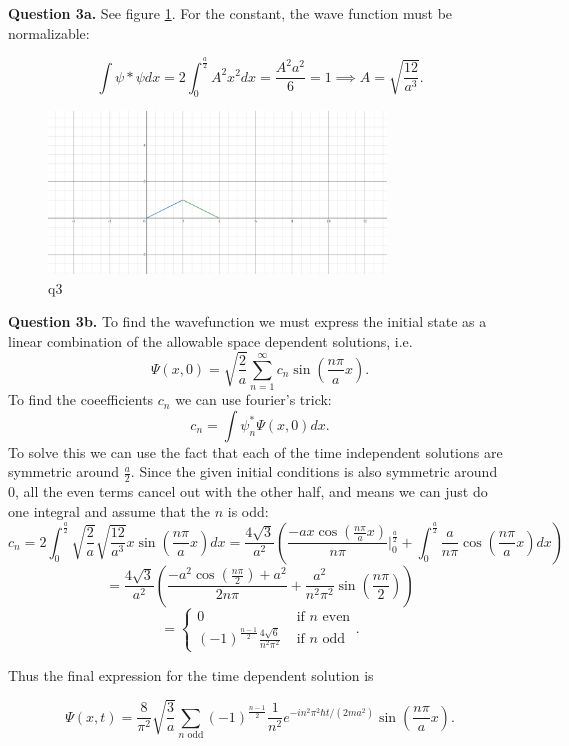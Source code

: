 \documentclass[letterpaper, reqno,11pt]{article}
\begin{document}
{\noindent\bf Question 3a.} See figure \ref{fig:q3}. For the constant, the wave function must be normalizable: 

\[
\int \psi*\psi dx=2\int_0^{\frac{a}{2}}A^2x^2dx=\frac{A^2a^2}{6}=1\implies A=\sqrt{\frac{12}{a^3}}
.\]

\begin{figure}[htpb]
    \centering
    \includegraphics[width=0.8\textwidth]{q3}
    \caption{q3}
    \label{fig:q3}
\end{figure}

{\noindent\bf Question 3b.} To find the wavefunction we must express the initial state as a linear combination of the allowable space dependent solutions, i.e.
\[
\Psi(x, 0)=\sqrt{\frac{2}{a}} \sum_{n=1}^{\infty}c_n\sin\left( \frac{n\pi}{a}x \right) 
.\]
To find the coeefficients $c_n$ we can use fourier's trick: 
\[
c_n=\int\psi_n^*\Psi(x, 0) dx
.\]
To solve this we can use the fact that each of the time independent solutions are symmetric around $\frac{a}{2}$. Since the given initial conditions is also symmetric around 0, all the even terms cancel out with the other half, and means we can just do one integral and assume that the $n$ is odd: 
\[
c_n=2\int_0^{\frac{a}{2}}\sqrt{\frac{2}{a}} \sqrt{\frac{12}{a^3}}x\sin\left( \frac{n\pi}{a}x \right) dx=\frac{4\sqrt{3} }{a^2}\left( \frac{-ax\cos\left( \frac{n\pi}{a}x \right) }{n\pi}\bigg|_0^{\frac{a}{2}} +\int_0^{\frac{a}{2}} \frac{a}{n\pi}\cos\left( \frac{n\pi}{a}x \right)dx \right)
\]
\[
=\frac{4\sqrt{3} }{a^2}\left( \frac{-a^2\cos\left( \frac{n\pi}{2} \right)+a^2 }{2n\pi} +\frac{a^2}{n^2\pi^2}\sin\left( \frac{n\pi}{2} \right)  \right)
\]
\[
=
\begin{cases}
    0&\text{ if $n$ even}\\
    (-1)^{\frac{n-1}2}\frac{4\sqrt{6} }{n^2\pi^2}&\text{ if $n$ odd}
\end{cases}
.\]

Thus the final expression for the time dependent solution is 

\[
\Psi(x, t)=\frac{8}{\pi^2}\sqrt{\frac{3}{a}}\sum_{n\text{ odd}}(-1)^{\frac{n-1}2}\frac{1}{n^2}e^{-in^2\pi^2\hbar t / (2ma^2)}\sin\left( \frac{n\pi}{a}x \right) 
.\]
\end{document}

